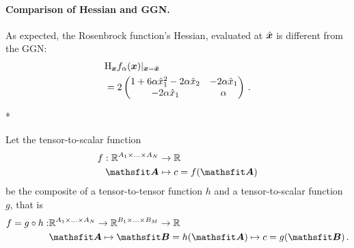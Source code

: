 \begin{example}
 \paragraph{Comparison of Hessian and GGN.}
 As expected, the Rosenbrock function's Hessian, evaluated at $\hat{{\bm{x}}}$ is different from the GGN:
  \begin{align*}
    &\mathrm{H}_{{\bm{x}}} f_{\alpha}({\bm{x}})|_{{\bm{x}} = \hat{{\bm{x}}}}
      \\
    &=
    2
    \begin{pmatrix}
      1 + 6 \alpha \hat{x}_1^2 - 2 \alpha \hat{x}_2 & -2 \alpha \hat{x}_1 \\
      -2 \alpha \hat{x}_1                      & \alpha
    \end{pmatrix}\,.
  \end{align*}
\end{example}


\switchcolumn[1]*
\switchcolumn[0]

\begin{setup}\label{setup:composite_tensor_to_tensor_to_scalar_function}
  Let the tensor-to-scalar function
  \begin{align*}
    f: \sR^{A_1 \times \ldots \times A_N} & \to \sR
    \\
    \tA                                   & \mapsto c = f(\tA)
  \end{align*}
  be the composite of a tensor-to-tensor function $h$ and a tensor-to-scalar function $g$, that is
  \begin{align*}
    f = g \circ h: & \sR^{A_1 \times \ldots \times A_N} \to \sR^{B_1 \times \ldots \times B_M}  \to \sR
    \\
                   & \tA \mapsto \tB = h(\tA) \mapsto c = g(\tB)\,.
  \end{align*}
\end{setup}

